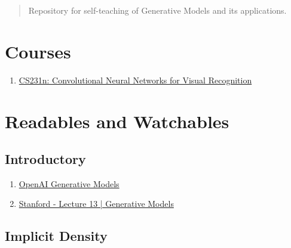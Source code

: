 \documentclass[12pt]{article}
\begin{document}
\maketitle
\tableofcontents

\begin{abstract}
  Repository for self-teaching of Generative Models and its applications.
\end{abstract}

\section{Courses}
\begin{enumerate}
  \item \href{http://cs231n.stanford.edu/}{CS231n: Convolutional Neural Networks for Visual Recognition}
\end{enumerate}

\section{Readables and Watchables}
\subsection{Introductory}
\begin{enumerate}
  \item \href{https://openai.com/blog/generative-models/}{OpenAI Generative Models}
  \item \href{https://www.youtube.com/watch?v=5WoItGTWV54}{Stanford - Lecture 13 | Generative Models}
\end{enumerate}

\subsection{Implicit Density}
\nocite{*}
\end{document}
